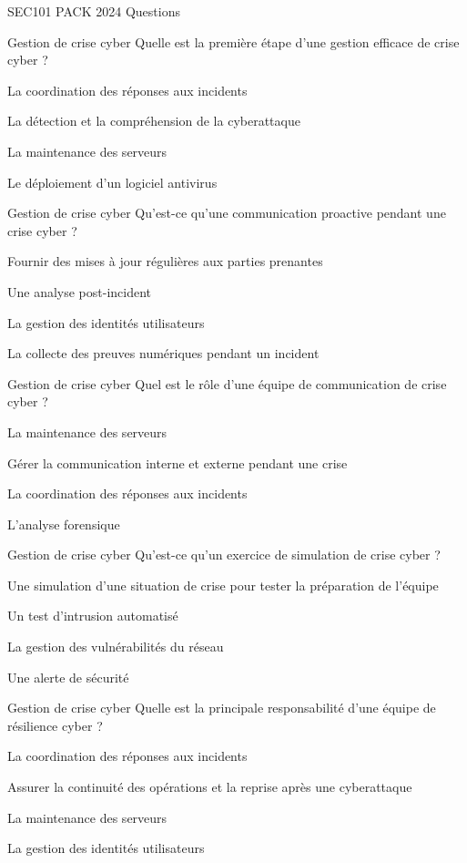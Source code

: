 \documentclass[12pt]{article}
\begin{document}
\begin{quiz}{SEC101 PACK 2024 Questions}
\begin{multi}[points=1]{Gestion de crise cyber}
Quelle est la première étape d'une gestion efficace de crise cyber ?
    \item La coordination des réponses aux incidents
    \item *La détection et la compréhension de la cyberattaque
    \item La maintenance des serveurs
    \item Le déploiement d'un logiciel antivirus
\end{multi}

\begin{multi}[points=1]{Gestion de crise cyber}
Qu'est-ce qu'une communication proactive pendant une crise cyber ?
    \item *Fournir des mises à jour régulières aux parties prenantes
    \item Une analyse post-incident
    \item La gestion des identités utilisateurs
    \item La collecte des preuves numériques pendant un incident
\end{multi}

\begin{multi}[points=1]{Gestion de crise cyber}
Quel est le rôle d'une équipe de communication de crise cyber ?
    \item La maintenance des serveurs
    \item *Gérer la communication interne et externe pendant une crise
    \item La coordination des réponses aux incidents
    \item L'analyse forensique
\end{multi}

\begin{multi}[points=1]{Gestion de crise cyber}
Qu'est-ce qu'un exercice de simulation de crise cyber ?
    \item *Une simulation d'une situation de crise pour tester la préparation de l'équipe
    \item Un test d'intrusion automatisé
    \item La gestion des vulnérabilités du réseau
    \item Une alerte de sécurité
\end{multi}

\begin{multi}[points=1, tags={M3Sec101, Secops}]{Gestion de crise cyber}
Quelle est la principale responsabilité d'une équipe de résilience cyber ?
    \item La coordination des réponses aux incidents
    \item *Assurer la continuité des opérations et la reprise après une cyberattaque
    \item La maintenance des serveurs
    \item La gestion des identités utilisateurs
\end{multi}


\end{quiz}
\end{document}
